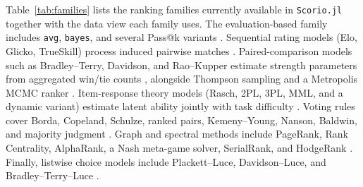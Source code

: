 \documentclass{juliacon}
\newcommand{\scorio}{\texttt{Scorio.jl}}
\begin{document}
Table~\ref{tab:families} lists the ranking families currently available in \scorio{} together with the data view each family uses. The evaluation-based family includes \texttt{avg}, \texttt{bayes}, and several Pass@k variants \cite{chen2021evaluating,hariri2025dontpassk}. Sequential rating models (Elo, Glicko, TrueSkill) process induced pairwise matches \cite{elo1978,glickman1999,herbrich2006trueskill}. Paired-comparison models such as Bradley--Terry, Davidson, and Rao--Kupper estimate strength parameters from aggregated win/tie counts \cite{BradleyTerry1952,davidson1970bties,rao1967ties}, alongside Thompson sampling and a Metropolis MCMC ranker \cite{Thompson1933,Metropolis1953}. Item-response theory models (Rasch, 2PL, 3PL, MML, and a dynamic variant) estimate latent ability jointly with task difficulty \cite{rasch1960rasch,birnbaum1968latent,Mislevy1986,BockAitkin1981,verhelst1993dynamicrasch}. Voting rules cover Borda, Copeland, Schulze, ranked pairs, Kemeny--Young, Nanson, Baldwin, and majority judgment \cite{Borda1781,Copeland1951,Condorcet1785,Schulze2010,Tideman1987,Kemeny1959,Young1977,Nanson1883,Baldwin1926,BalinskiLaraki2011}. Graph and spectral methods include PageRank, Rank Centrality, AlphaRank, a Nash meta-game solver, SerialRank, and HodgeRank \cite{page1999pagerank,vigna2016spectral,negahban2017rankcentrality,omidshafiei2019alpharank,balduzzi2018reevaluating,fogel2016serialrank,jiang2009hodgerank}. Finally, listwise choice models include Plackett--Luce, Davidson--Luce, and Bradley--Terry--Luce \cite{plackett1975permutations,firth2019davidsonluce,luce1959choice}.
\end{document}
